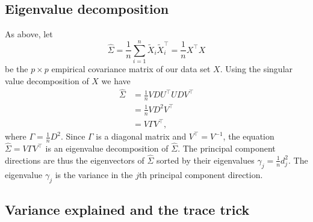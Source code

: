 \subsection{Eigenvalue decomposition}

As above, let 
\[
    \widehat{\Sigma}=\frac{1}{n}\sum_{i=1}^n \widetilde{X}_i\widetilde{X}_i^\top = \frac{1}{n}X^\top X 
\] 
be the $p \times p$ empirical covariance matrix of our data set $X$. Using the singular value decomposition of $X$ we have
\begin{align*}
    \widehat{\Sigma}&=\frac{1}{n} VDU^\top U DV^\top \\
    &=\frac{1}{n} V D^2 V^\top\\
    &=V\Gamma V^\top,
\end{align*}
where $\Gamma = \frac{1}{n}D^2$. Since $\Gamma$ is a diagonal matrix and $V^\top = V^{-1}$, the equation $\widehat{\Sigma} = V\Gamma V^\top$ is an eigenvalue decomposition of $\widehat{\Sigma}$. The principal component directions are thus the eigenvectors of $\widehat{\Sigma}$ sorted by their eigenvalues $\gamma_j = \frac{1}{n}d_j^2$. The eigenvalue $\gamma_j$ is the variance in the $j$th principal component direction.

\subsection{Variance explained and the trace trick}

